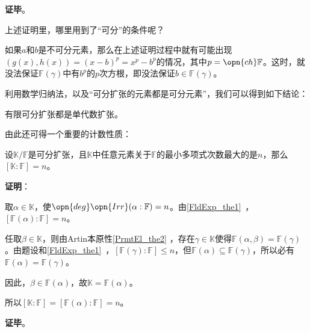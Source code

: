 \textbf{证毕}。

上述证明里，哪里用到了“可分”的条件呢？

如果$a$和$b$是不可分元素，那么在上述证明过程中就有可能出现$(g(x), h(x))=(x-b)^p=x^p-b^p$的情况，其中$p=\opn{ch}\mathbb{F}$。这时，就没法保证$\mathbb{F}(\gamma)$中有$b^p$的$p$次方根，即没法保证$b\in\mathbb{F}(\gamma)$。

利用数学归纳法，以及“可分扩张的元素都是可分元素”，我们可以得到如下结论：

\begin{corollary}{}\label{PrmtEl_cor2}
有限可分扩张都是单代数扩张。
\end{corollary}



由此还可得一个重要的计数性质：

\begin{corollary}{}\label{PrmtEl_cor3}
设$\mathbb{K}/\mathbb{F}$是可分扩张，且$\mathbb{K}$中任意元素关于$\mathbb{F}$的最小多项式次数最大的是$n$，那么$[\mathbb{K}:\mathbb{F}] = n$。
\end{corollary}

\textbf{证明}：

取$\alpha\in\mathbb{K}$，使$\opn{deg}\opn{Irr}(\alpha:\mathbb{F})=n$。由\autoref{FldExp_the1}~，$[\mathbb{F}(\alpha):\mathbb{F}]=n$。

任取$\beta\in\mathbb{K}$，则由Artin本原性\autoref{PrmtEl_the2} ，存在$\gamma\in\mathbb{K}$使得$\mathbb{F}(\alpha, \beta)=\mathbb{F}(\gamma)$。由题设和\autoref{FldExp_the1}~，$[\mathbb{F}(\gamma):\mathbb{F}]\leq n$，但$\mathbb{F}(\alpha)\subseteq\mathbb{F}(\gamma)$，所以必有$\mathbb{F}(\alpha)=\mathbb{F}(\gamma)$。

因此，$\beta\in\mathbb{F}(\alpha)$，故$\mathbb{K}=\mathbb{F}(\alpha)$。

所以$[\mathbb{K}:\mathbb{F}]=[\mathbb{F}(\alpha):\mathbb{F}]=n$。

\textbf{证毕}。
















